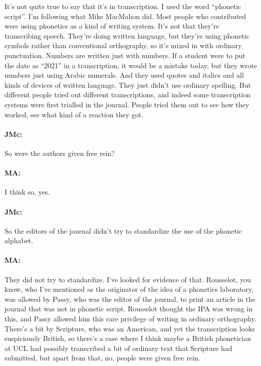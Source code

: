 \documentclass[output=paper]{langscibook}
\begin{document}
It’s not quite true to say that it’s in transcription. I used the word ``phonetic script''. I’m following what Mike MacMahon did. Most people who contributed were using phonetics as a kind of writing system. It’s not that they’re transcribing speech. They’re doing written language, but they’re using phonetic symbols rather than conventional orthography, so it’s mixed in with ordinary punctuation. Numbers are written just with numbers. If a student were to put the date as ``2021'' in a transcription, it would be a mistake today, but they wrote numbers just using Arabic numerals. And they used quotes and italics and all kinds of devices of written language. They just didn’t use ordinary spelling. But different people tried out different transcriptions, and indeed some transcription systems were first trialled in the journal. People tried them out to see how they worked, see what kind of a reaction they got.

\paragraph*{JMc:} So were the authors given free rein?

\paragraph*{MA:} I think so, yes.

\paragraph*{JMc:} So the editors of the journal didn’t try to standardize the use of the phonetic alphabet.

\paragraph*{MA:} They did not try to standardize. I’ve looked for evidence of that. Rousselot, you know, who I’ve mentioned as the originator of the idea of a phonetics laboratory, was allowed by Passy, who was the editor of the journal, to print an article in the journal that was not in phonetic script. Rousselot thought the IPA was wrong in this, and Passy allowed him this rare privilege of writing in ordinary orthography. There’s a bit by Scripture, who was an American, and yet the transcription looks suspiciously British, so there’s a case where I think maybe a British phonetician at UCL had possibly transcribed a bit of ordinary text that Scripture had submitted, but apart from that, no, people were given free rein.
\end{document}
